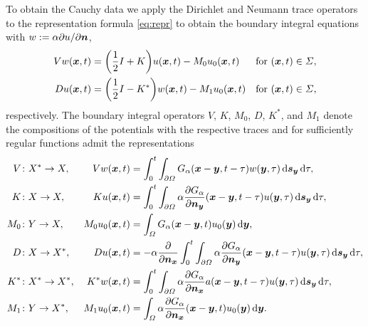 \documentclass[a4paper,11pt]{article}
\begin{document}
To obtain the Cauchy data we apply the Dirichlet and Neumann trace operators to the representation formula \eqref{eq:repr} to obtain the boundary integral equations with $w := \alpha\partial u/\partial {\ensuremath{{\bm{n}}}} $,
\begin{align*}
  Vw({{\bm{x}}},t) &= \bigg(\frac{1}{2} I + K \bigg) u({{\bm{x}}},t) - M_0 u_0({{\bm{x}}},t) &&\text{for } ({{\bm{x}}},t) \in \Sigma, \\
  Du({{\bm{x}}},t) &= \bigg(\frac{1}{2} I - K^\ast \bigg) w({{\bm{x}}},t) - M_1 u_0({{\bm{x}}},t) &&\text{for } ({{\bm{x}}},t) \in \Sigma,
\end{align*}
respectively. The boundary integral operators $V$, $K$, $M_0$, $D$, $K^\ast$, and $M_1$ denote the compositions of the potentials with the respective traces and for sufficiently regular functions admit the representations
\begin{align*}
  V &\colon X^\ast \to X, &Vw({{\bm{x}}},t) &= \int_0^t \int_{\partial\Omega} G_\alpha({{\bm{x}}}-{{\bm{y}}},t-\tau) w({{\bm{y}}},\tau) \,{\mathrm{d}}{{\bm{s}}}_{{\bm{y}}} \,{\mathrm{d}}\tau, \\
  K &\colon X \to X, &Ku({{\bm{x}}},t) &= \int_0^t \int_{\partial\Omega} \alpha\frac{\partial G_\alpha}{\partial {\ensuremath{{\bm{n}}}}_{{\bm{y}}}}({{\bm{x}}}-{{\bm{y}}},t-\tau) u({{\bm{y}}},\tau) \,{\mathrm{d}}{{\bm{s}}}_{{\bm{y}}} \,{\mathrm{d}}\tau, \\
  M_0 &\colon Y \to X, &M_0 u_0({{\bm{x}}},t) &= \int_\Omega G_\alpha({{\bm{x}}}-{{\bm{y}}},t) u_0({{\bm{y}}}) \,{\mathrm{d}}{{\bm{y}}}, \\
  D &\colon X \to X^\ast, &Du({{\bm{x}}},t) &= -\alpha \frac{\partial}{\partial {\ensuremath{{\bm{n}}}}_{{\bm{x}}}} \int_0^t \int_{\partial\Omega} \alpha\frac{\partial G_\alpha}{\partial {\ensuremath{{\bm{n}}}}_{{\bm{y}}}}({{\bm{x}}}-{{\bm{y}}},t-\tau) u({{\bm{y}}},\tau) \,{\mathrm{d}}{{\bm{s}}}_{{\bm{y}}} \,{\mathrm{d}}\tau, \\
  K^\ast &\colon X^\ast \to X^\ast, &K^\ast w({{\bm{x}}},t) &= \int_0^t \int_{\partial\Omega} \alpha\frac{\partial G_\alpha}{\partial {\ensuremath{{\bm{n}}}}_{{\bm{x}}}}a({{\bm{x}}}-{{\bm{y}}},t-\tau) u({{\bm{y}}},\tau) \,{\mathrm{d}}{{\bm{s}}}_{{\bm{y}}} \,{\mathrm{d}}\tau, \\
  M_1 &\colon Y \to X^\ast, &M_1 u_0({{\bm{x}}},t) &= \int_\Omega \alpha\frac{\partial G_\alpha}{\partial {\ensuremath{{\bm{n}}}}_{{\bm{x}}}}({{\bm{x}}}-{{\bm{y}}},t) u_0({{\bm{y}}}) \,{\mathrm{d}}{{\bm{y}}}.
\end{align*}
\end{document}
